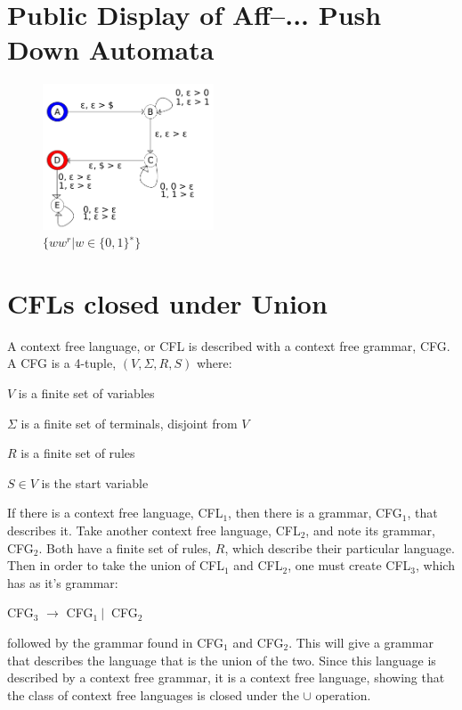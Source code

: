 \documentclass[10pt,reqno,sumlimits]{amsart}
\theoremstyle{plain}
\theoremstyle{definition}
\newcommand{\1}{{\bf 1}}
\numberwithin{equation}{section}
\begin{document}
\section {Public Display of Aff--... Push Down Automata}

\begin{figure}[htbp]
\centerline{
    \mbox{\includegraphics[width=2in]{figures/3_3.pdf}}
  }
  \caption{$\{ww^r |w \in \{0, 1\}^∗ \}$}
  \label{fig:fit}
\end{figure}

\section {CFLs closed under Union}
A context free language, or CFL is described with a context free grammar, CFG. A CFG is a 4-tuple, $(V, \Sigma, R, S)$ where:

\hspace{0.5in}$V$ is a finite set of variables

\hspace{0.5in}$\Sigma$ is a finite set of terminals, disjoint from $V$

\hspace{0.5in}$R$ is a finite set of rules

\hspace{0.5in}$S \in V$ is the start variable

\hspace{0.3in}If there is a context free language, CFL$_1$, then there is a grammar, CFG$_1$, that describes it. Take another context free language, CFL$_2$, and note its grammar, CFG$_2$. Both have a finite set of rules, $R$, which describe their particular language. Then in order to take the union of CFL$_1$ and CFL$_2$, one must create CFL$_3$, which has as it's grammar:

\hspace{0.5in} CFG$_3$ $\rightarrow$ CFG$_1 \ |\ $ CFG$_2$

\hspace{0.3in} followed by the grammar found in CFG$_1$ and CFG$_2$. This will give a grammar that describes the language that is the union of the two. Since this language is described by a context free grammar, it is a context free language, showing that the class of context free languages is closed under the $\cup$ operation.
\end{document}

